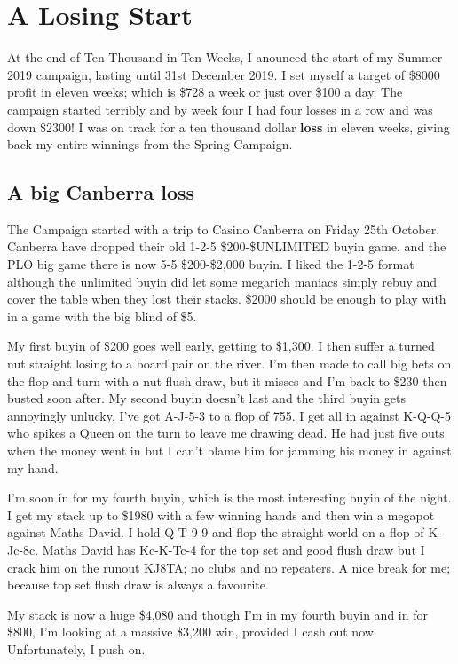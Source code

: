 \chapter{A Losing Start}

At the end of Ten Thousand in Ten Weeks, I anounced the start of my
Summer 2019 campaign, lasting until 31st December 2019. I set myself a
target of \$8000 profit in eleven weeks; which is \$728 a week or just
over \$100 a day. The campaign started terribly and by week four I had
four losses in a row and was down \$2300! I was on track for a ten
thousand dollar \textbf{loss} in eleven weeks, giving back my entire
winnings from the Spring Campaign.

\section*{A big Canberra loss}

The Campaign started with a trip to Casino Canberra on Friday 25th
October. Canberra have dropped their old 1-2-5 \$200-\$UNLIMITED buyin
game, and the PLO big game there is now 5-5 \$200-\$2,000 buyin. I
liked the 1-2-5 format although the unlimited buyin did let some
megarich maniacs simply rebuy and cover the table when they lost their
stacks. \$2000 should be enough to play with in a game with the big
blind of \$5.

My first buyin of \$200 goes well early, getting to \$1,300. I then
suffer a turned nut straight losing to a board pair on the river. I'm
then made to call big bets on the flop and turn with a nut flush draw,
but it misses and I'm back to \$230 then busted soon after. My second
buyin doesn't last and the third buyin gets annoyingly unlucky. I've
got A-J-5-3 to a flop of 755. I get all in against K-Q-Q-5 who spikes
a Queen on the turn to leave me drawing dead. He had just five outs
when the money went in but I can't blame him for jamming his money in
against my hand.

I'm soon in for my fourth buyin, which is the most interesting buyin
of the night. I get my stack up to \$1980 with a few winning hands and
then win a megapot against Maths David. I hold Q-T-9-9 and flop the
straight world on a flop of K-Jc-8c. Maths David has Kc-K-Tc-4 for the
top set and good flush draw but I crack him on the runout KJ8TA; no
clubs and no repeaters. A nice break for me; because top set flush
draw is always a favourite.

My stack is now a huge \$4,080 and though I'm in my fourth buyin
and in for \$800, I'm looking at a massive \$3,200 win, provided I cash out
now. Unfortunately, I push on.

